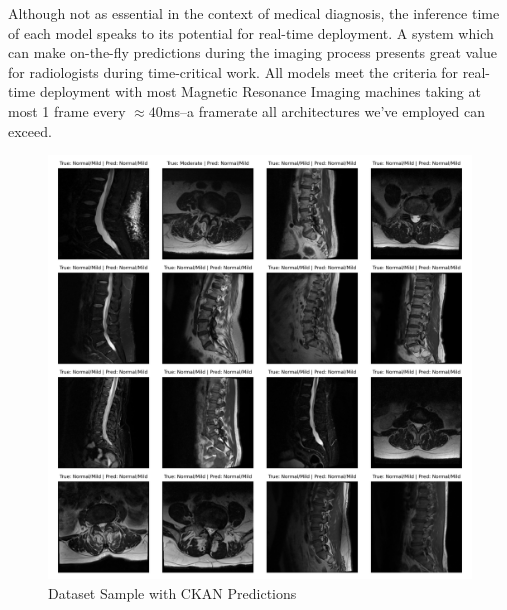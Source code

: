 \documentclass[conference]{IEEEtran}
\begin{document}
Although not as essential in the context of medical diagnosis, the inference time of each model speaks to its potential for real-time deployment. A system which can make on-the-fly predictions during the imaging process presents great value for radiologists during time-critical work. All models meet the criteria for real-time deployment with most Magnetic Resonance Imaging machines taking at most 1 frame every $\approx 40$ms--a framerate all architectures we've employed can exceed.


\begin{figure}[H]
    \centering
    \includegraphics[width=1\linewidth]{visuals/dataset_sample_preds.png}
    \caption{Dataset Sample with CKAN Predictions}
    \label{fig:sample-preds}
\end{figure}


\end{document}
